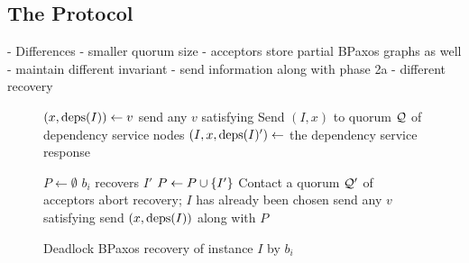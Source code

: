 %
%

















\subsection{The Protocol}
- Differences
  - smaller quorum size
  - acceptors store partial BPaxos graphs as well
  - maintain different invariant
  - send information along with phase 2a
  - different recovery

\begin{wrapfigure}{r}{3.6in}
  \begin{minipage}{3.6in}
    \begin{algorithm}[H]
      \caption{Deadlock BPaxos recovery of instance $I$ by $b_i$}%
      \begin{algorithmic}[1]
          \State $(x, \text{deps}(I)) \gets v$
        \Else{}
          \State send any $v$ satisfying 
        \EndIf{}
        \State Send $(I, x)$ to quorum $\mathcal{Q}$ of dependency service nodes
        \State $(I, x, \text{deps}(I)') \gets$ the dependency service response

        \State
        \State $P \gets \emptyset$
            \State $b_i$ recovers $I'$
          \EndIf
            \State $P \gets P \cup \{I'\}$
          \Else{}
            \State Contact a quorum $\mathcal{Q}'$ of acceptors
              \State abort recovery; $I$ has already been chosen
            \Else{}
              \State send any $v$ satisfying 
            \EndIf{}
          \EndIf{}
        \EndFor{}
        \State send $(x, \text{deps}(I))$ along with $P$
      \end{algorithmic}
    \end{algorithm}
  \end{minipage}
\end{wrapfigure}

